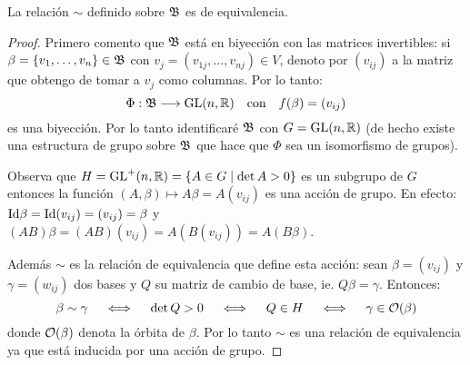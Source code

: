 \begin{ejercicio}\label{ej:24}
  La relaci\'on $\sim$ definido sobre $\mathfrak{B}$ es de equivalencia.
\end{ejercicio}
\begin{proof}%
  Primero comento que $\mathfrak{B}$ est\'a en biyecci\'on con las matrices invertibles: si
  $\beta=\{v_1,\ldots,v_n\}\in\mathfrak{B}$ con $v_j=(v_{1j},\ldots,v_{nj})\in V$, denoto por $(v_{ij})$ a
  la matriz que obtengo de tomar a $v_j$ como columnas. Por lo tanto:
  \[
    \Phi:\mathfrak{B} \longrightarrow \text{GL}(n,\mathbb{R})  \quad\text{con}\quad f(\beta)=(v_{ij})
  \]
  es una biyecci\'on. Por lo tanto identificar\'e $\mathfrak{B}$ con $G=\text{GL}(n,\mathbb{R})$ (de hecho existe
  una estructura de grupo sobre $\mathfrak{B}$ que hace que $\Phi$ sea un isomorfismo de grupos).
  
  Observa que $H=\text{GL}^+(n,\mathbb{R})=\{A\in G\mid \det{A}>0\}$ es un subgrupo de $G$
  entonces la funci\'on $(A,\beta)\mapsto A\beta=A(v_{ij})$ es una acci\'on de grupo.
  En efecto: $\text{Id}\beta=\text{Id}(v_{ij})=(v_{ij})=\beta$ y $(AB)\beta=(AB)(v_{ij})=A(B(v_{ij}))=A(B\beta)$.

  Adem\'as $\sim$ es la relaci\'on de equivalencia que define esta acci\'on: sean $\beta=(v_{ij})$ y
  $\gamma=(w_{ij})$ dos bases y $Q$ su matriz de cambio de base, ie. $Q\beta=\gamma$. Entonces:
  \[
    \beta\sim\gamma \quad\iff\quad \det Q>0 \quad\iff\quad Q\in H \quad\iff\quad \gamma\in\mathcal{O}(\beta)
  \]
  donde $\mathcal{O}(\beta)$ denota la \'orbita de $\beta$. Por lo tanto $\sim$ es una relaci\'on de
  equivalencia ya que est\'a inducida por una acci\'on de grupo.  
\end{proof}%

